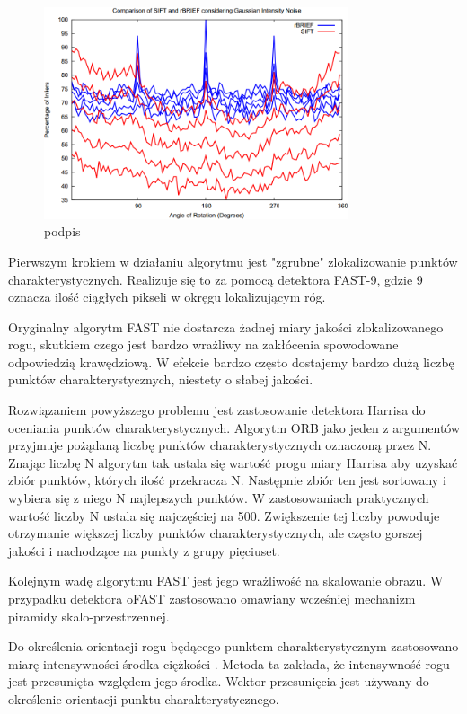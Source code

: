 \begin{figure}
\centering
\includegraphics[width=0.8\textwidth]{pict/02/orb/orb_wykres_8.png}
\caption{podpis}
\label{fig:orb_wykres_8}
\end{figure}

Pierwszym krokiem w działaniu algorytmu jest "zgrubne" zlokalizowanie punktów charakterystycznych. Realizuje się to za pomocą detektora FAST-9, gdzie 9 oznacza ilość ciągłych pikseli w okręgu lokalizującym róg.

Oryginalny algorytm FAST nie dostarcza żadnej miary jakości zlokalizowanego rogu,  skutkiem czego jest bardzo wrażliwy na zakłócenia spowodowane odpowiedzią krawędziową. W efekcie bardzo często dostajemy bardzo dużą liczbę punktów charakterystycznych, niestety o słabej jakości. 

Rozwiązaniem powyższego problemu jest zastosowanie detektora Harrisa do oceniania punktów charakterystycznych. Algorytm ORB jako jeden z argumentów przyjmuje pożądaną liczbę punktów charakterystycznych oznaczoną przez N. Znając liczbę N algorytm tak ustala się wartość progu miary Harrisa aby uzyskać zbiór punktów, których ilość przekracza N. Następnie zbiór ten jest sortowany i wybiera się z niego N najlepszych punktów. W zastosowaniach praktycznych wartość liczby N ustala się najczęściej na 500. Zwiększenie tej liczby powoduje otrzymanie większej liczby punktów charakterystycznych, ale często gorszej jakości i nachodzące na punkty z grupy pięciuset.

Kolejnym wadę algorytmu FAST jest jego wrażliwość na skalowanie obrazu. W przypadku detektora oFAST zastosowano omawiany wcześniej mechanizm piramidy skalo-przestrzennej.

Do określenia orientacji rogu będącego punktem charakterystycznym zastosowano miarę intensywności środka ciężkości \cite{centroid}. Metoda ta zakłada, że intensywność rogu jest przesunięta względem jego środka. Wektor przesunięcia jest używany do określenie orientacji punktu charakterystycznego. 

